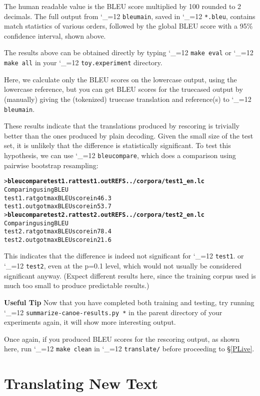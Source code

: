 \documentclass[11pt,letterpaper]{article}
\def\code{\begingroup\catcode`\_=12 \codex}
\newcommand{\codex}[1]{\texttt{#1}\endgroup}
\newcommand{\tip}{\textbf{Useful Tip \large{\ding{43}} }}
\newcommand{\margintip}{\marginpar[{\textbf{Tip \large{\ding{43}}}}]{\textbf{\reflectbox{\large{\ding{43}}} Tip}}}
\newcommand{\tipend}{\textbf{ \reflectbox{\large{\ding{43}}}}}
\begin{document}
The human readable value is the BLEU score multiplied by 100 rounded to 2
decimals. The full output from \code{bleumain}, saved in \code{*.bleu},
contains match statistics of various orders, followed by the global BLEU score
with a 95\% confidence interval, shown above.

The results above can be obtained directly by typing \code{make eval} or
\code{make all} in your \code{toy.experiment} directory.

Here, we calculate only the BLEU scores on the lowercase output, using the
lowercase reference, but you can get BLEU scores for the truecased output by
(manually) giving the (tokenized) truecase translation and reference(s) to \code{bleumain}.

These results indicate that the translations produced by rescoring is trivially better
than the ones produced by plain decoding. Given the small size of the test set,
it is unlikely that the difference is statistically significant. To test
this hypothesis, we can use \code{bleucompare}, which does a comparison using
pairwise bootstrap resampling:
\begin{small}
\begin{alltt}
   > \textbf{bleucompare test1.rat test1.out REFS ../corpora/test1_en.lc}
   Comparing using BLEU
   test1.rat got max BLEU score in 46.3% of samples
   test1.out got max BLEU score in 53.7% of samples
   > \textbf{bleucompare test2.rat test2.out REFS ../corpora/test2_en.lc}
   Comparing using BLEU
   test2.rat got max BLEU score in 78.4% of samples
   test2.out got max BLEU score in 21.6% of samples
\end{alltt}
\end{small}
This indicates that the difference is indeed not significant for \code{test1}.
or \code{test2}, even at the p=0.1 level, which would not
usually be considered significant anyway.  (Expect
different results here, since the training corpus used is much too small to
produce predictable results.)

\tip \margintip Now that you have completed both training and testing, try
running \code{summarize-canoe-results.py *} in the parent directory of your
experiments again, it will show more interesting output.\tipend

Once again, if you produced BLEU scores for the rescoring output, as shown
here, run \code{make clean} in \code{translate/} before proceeding to \S\ref{PLive}.

\section{Translating New Text} \label{NewText}
\end{document}
